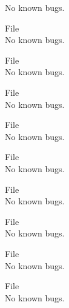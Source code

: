 \begin{DoxyRefList}
\label{bug__bug000030}%
%
No known bugs.  
\item[File \doxylink{_s_a_t___const_8hpp}{SAT\+\_\+\+Const.hpp} ]\hfill \\
\label{bug__bug000031}%
%
No known bugs.  
\item[File \doxylink{sign___8cpp}{sign\+\_\+.cpp} ]\hfill \\
\label{bug__bug000066}%
%
No known bugs.  
\item[File \doxylink{sign___8hpp}{sign\+\_\+.hpp} ]\hfill \\
\label{bug__bug000032}%
%
No known bugs.  
\item[File \doxylink{timediff_8cpp}{timediff.cpp} ]\hfill \\
\label{bug__bug000067}%
%
No known bugs.  
\item[File \doxylink{timediff_8hpp}{timediff.hpp} ]\hfill \\
\label{bug__bug000033}%
%
No known bugs.  
\item[File \doxylink{_time_update_8cpp}{Time\+Update.cpp} ]\hfill \\
\label{bug__bug000068}%
%
No known bugs.  
\item[File \doxylink{_time_update_8hpp}{Time\+Update.hpp} ]\hfill \\
\label{bug__bug000034}%
%
No known bugs.  
\item[File \doxylink{_var_eqn_8cpp}{Var\+Eqn.cpp} ]\hfill \\
\label{bug__bug000069}%
%
No known bugs.  
\item[File \doxylink{_var_eqn_8hpp}{Var\+Eqn.hpp} ]\hfill \\
\label{bug__bug000035}%
%
No known bugs. 
\end{DoxyRefList}